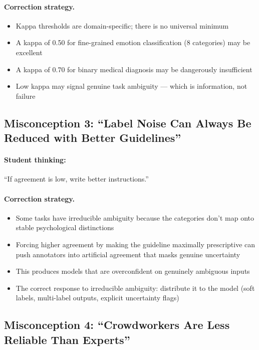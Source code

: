 \paragraph{Correction strategy.}
\begin{itemize}
    \item Kappa thresholds are domain-specific; there is no universal minimum
    \item A kappa of 0.50 for fine-grained emotion classification (8 categories) may be excellent
    \item A kappa of 0.70 for binary medical diagnosis may be dangerously insufficient
    \item Low kappa may signal genuine task ambiguity --- which is information, not failure
\end{itemize}

\subsection{Misconception 3: ``Label Noise Can Always Be Reduced with Better Guidelines''}

\paragraph{Student thinking:} ``If agreement is low, write better instructions.''

\paragraph{Correction strategy.}
\begin{itemize}
    \item Some tasks have irreducible ambiguity because the categories don't map onto stable psychological distinctions
    \item Forcing higher agreement by making the guideline maximally prescriptive can push annotators into artificial agreement that masks genuine uncertainty
    \item This produces models that are overconfident on genuinely ambiguous inputs
    \item The correct response to irreducible ambiguity: distribute it to the model (soft labels, multi-label outputs, explicit uncertainty flags)
\end{itemize}

\subsection{Misconception 4: ``Crowdworkers Are Less Reliable Than Experts''}

